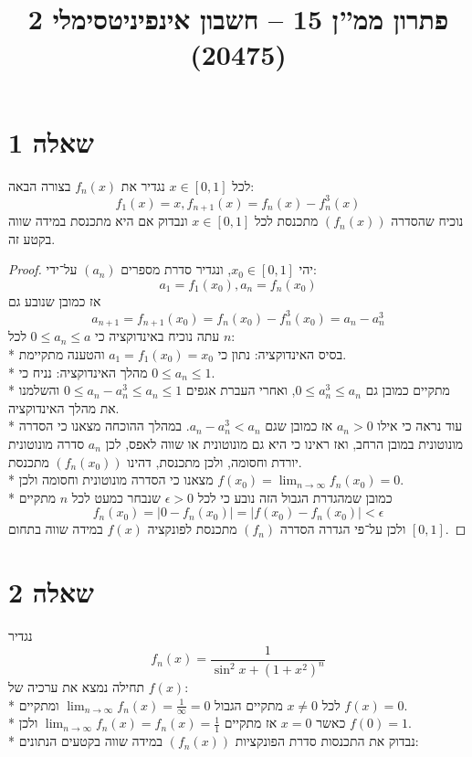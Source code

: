 
\title{פתרון ממ''ן 15 – חשבון אינפיניטסימלי 2 (20475)}


\maketitle
\maketitleprint{}

\section{שאלה 1}
לכל $x \in [0, 1]$ נגדיר את $f_n(x)$ בצורה הבאה:
\[
	f_1(x) = x, f_{n + 1}(x) = f_n(x) - f_n^3(x)
\]
נוכיח שהסדרה $(f_n(x))$ מתכנסת לכל $x \in [0, 1]$ ונבדוק אם היא מתכנסת במידה שווה בקטע זה.
\begin{proof}
	יהי $x_0 \in [0, 1]$, ונגדיר סדרת מספרים $(a_n)$ על־ידי:
	\[
		a_1 = f_1(x_0), a_{n} = f_n(x_0)
	\]
	אז כמובן שנובע גם
	\[
		a_{n + 1}
		= f_{n + 1}(x_0)
		= f_n(x_0) - f_n^3(x_0) 
		= a_n - a_n^3
	\]
	עתה נוכיח באינדוקציה כי $0 \le a_n \le a$ לכל $n$: \\*
	בסיס האינדוקציה: נתון כי $a_1 = f_1(x_0) = x_0$ והטענה מתקיימת. \\*
	מהלך האינדוקציה: נניח כי $0 \le a_n \le 1$. \\*
	מתקיים כמובן גם $0 \le a_n^3 \le a_n$, ואחרי העברת אגפים $0 \le a_n - a_n^3 \le a_n \le 1$ והשלמנו את מהלך האינדוקציה. \\*
	עוד נראה כי אילו $a_n > 0$ אז כמובן שגם $a_n - a_n^3 < a_n$.
	במהלך ההוכחה מצאנו כי הסדרה מונוטונית במובן הרחב, ואז ראינו כי היא גם מונוטונית או שווה לאפס,
	לכן $a_n$ סדרה מונוטונית יורדת וחסומה, ולכן מתכנסת, דהינו $(f_n(x_0))$ מתכנסת. \\*
	מצאנו כי הסדרה מונוטונית וחסומה ולכן $f(x_0) = \lim_{n \to \infty} f_n(x_0) = 0$. \\*
	כמובן שמהגדרת הגבול הזה נובע כי לכל $\epsilon > 0$ שנבחר כמעט לכל $n$ מתקיים 
	\[
		f_n(x_0) = \lvert 0 - f_n(x_0) \rvert = \lvert f(x_0) - f_n(x_0) \rvert < \epsilon
	\]
	ולכן על־פי הגדרה הסדרה $(f_n)$ מתכנסת לפונקציה $f(x)$ במידה שווה בתחום $[0, 1]$.
\end{proof}

\section{שאלה 2}
נגדיר
\[
	f_n(x) = \frac{1}{\sin^2 x + {(1 + x^2)}^n}
\]
תחילה נמצא את ערכיה של $f(x)$: \\*
לכל $x \ne 0$ מתקיים הגבול $\lim_{n \to \infty} f_n(x) = \frac{1}{\infty} = 0$ ומתקיים $f(x) = 0$. \\*
כאשר $x = 0$ אז מתקיים $\lim_{n \to \infty} f_n(x) = f_n(x) = \frac{1}{1}$ ולכן $f(0) = 1$. \\*
נבדוק את התכנסות סדרת הפונקציות $(f_n(x))$ במידה שווה בקטעים הנתונים:

